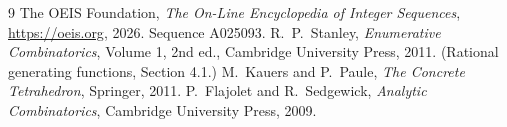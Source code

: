 \documentclass[11pt,a4paper]{article}
\theoremstyle{plain}
\theoremstyle{definition}
\begin{document}
\begin{thebibliography}{9}
 The OEIS Foundation, \emph{The On-Line Encyclopedia of Integer
Sequences}, \url{https://oeis.org}, 2026. Sequence A025093.
 R.~P.~Stanley, \emph{Enumerative Combinatorics}, Volume 1, 2nd ed.,
Cambridge University Press, 2011. (Rational generating functions, Section 4.1.)
 M.~Kauers and P.~Paule, \emph{The Concrete Tetrahedron}, Springer, 2011.
 P.~Flajolet and R.~Sedgewick, \emph{Analytic Combinatorics}, Cambridge
University Press, 2009.
\end{thebibliography}
\end{document}
